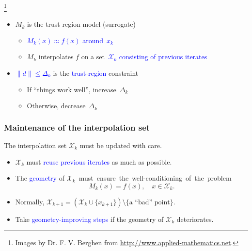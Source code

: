 \documentclass[slidestop,mathserif,xcolor=dvipsnames]{beamer}
\newcommand\blfootnote[1]{%
  \begingroup
  \renewcommand\thefootnote{}\footnote{#1}%
  \addtocounter{footnote}{-1}%
  \endgroup
}
\newcommand{\blue}[1]{\textcolor{blue}{#1}}
\begin{document}
\begin{frame}
\begin{beamerboxesrounded}[width=7cm,shadow=true]{}
\begin{equation*}
    \end{equation*}
    \end{beamerboxesrounded}
    \blfootnote{Images by Dr. F. V. Berghen from \url{http://www.applied-mathematics.net}.}
    \vspace{0.2ex}
\begin{itemize}
  \item $M_k$ is the trust-region model  (surrogate)
    \begin{itemize}
        \item \blue{$M_k(x)\approx f(x)$ around~$x_k$}
      \item  $M_k$ interpolates $f$ on a set~\blue{$\mathcal{X}_k$ consisting of previous iterates}
    \end{itemize}
\vspace{0.6ex}
  \item \blue{$\|d\|\le\Delta_k$} is the \blue{trust-region} constraint
      \begin{itemize}
          \item If ``things work well'', increase~$\Delta_k$
          \item Otherwise, decrease~$\Delta_k$
          \end{itemize}
\end{itemize}

\end{frame}


\begin{frame}
    \frametitle{Maintenance of the interpolation set}
    \vspace{2ex}
    The interpolation set $\mathcal{X}_k$ must be updated with care.
    \vspace{1ex}
    \begin{itemize}
        \item $\mathcal{X}_k$ must \blue{reuse previous iterates} as much as possible.
    \vspace{1ex}
\item The \blue{geometry} of \mbox{$\mathcal{X}_k$ must ensure the well-conditioning of~the~problem}
            \[
                M_k(x) = f(x), \quad x \in \mathcal{X}_k.
            \]
\item Normally, $\mathcal{X}_{k+1} = \left(\mathcal{X}_{k}\cup\{x_{k+1}\}\right) \setminus\{\text{a ``bad'' point}\}$.
    \vspace{1ex}
\item Take \blue{geometry-improving steps} if the geometry of $\mathcal{X}_k$ deteriorates.
    \end{itemize}
\end{frame}
\end{document}

